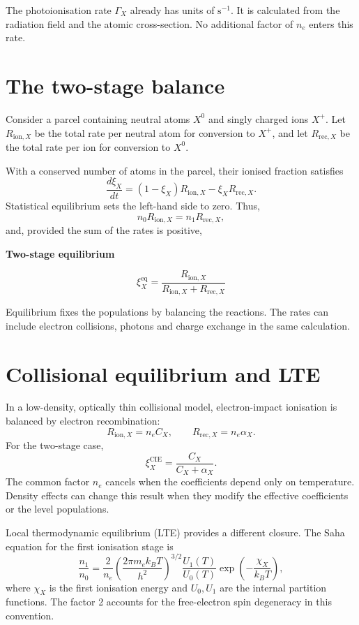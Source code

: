 \documentclass[a4paper,10pt,twoside,openany]{book}
\numberwithin{equation}{chapter}
\newcommand{\formula}[2][]{%
  \begin{tcolorbox}[enhanced,breakable,
    colback=LightOrange,colframe=Cap2Orange,arc=6pt,boxrule=1.2pt]
    \if\relax\detokenize{#1}\relax\else
      {\small\bfseries\color{Cap2Orange}#1}\par\smallskip
    \fi
    \begin{equation*}#2\end{equation*}
  \end{tcolorbox}}
\begin{document}
The photoionisation rate $\Gamma_X$ already has units of
$\mathrm{s^{-1}}$. It is calculated from the radiation field and
the atomic cross-section. No additional factor of $n_e$ enters this
rate.

\section{The two-stage balance}
Consider a parcel containing neutral atoms $X^0$ and singly charged
ions $X^+$. Let $R_{\mathrm{ion},X}$ be the total rate per neutral
atom for conversion to $X^+$, and let $R_{\mathrm{rec},X}$ be the
total rate per ion for conversion to $X^0$.

With a conserved number of atoms in the parcel, their ionised
fraction satisfies
\begin{equation}
  \frac{d\xi_X}{dt}
  =(1-\xi_X)R_{\mathrm{ion},X}
  -\xi_X R_{\mathrm{rec},X}.
  \label{eq:two_stage_time}
\end{equation}
Statistical equilibrium sets the left-hand side to zero. Thus,
\begin{equation}
  n_0R_{\mathrm{ion},X}=n_1R_{\mathrm{rec},X},
\end{equation}
and, provided the sum of the rates is positive,
\formula[Two-stage equilibrium]{
  \xi_X^{\mathrm{eq}}
  =\frac{R_{\mathrm{ion},X}}
  {R_{\mathrm{ion},X}+R_{\mathrm{rec},X}}}

Equilibrium fixes the populations by balancing the reactions.
The rates can include electron collisions, photons and charge
exchange in the same calculation.

\section{Collisional equilibrium and LTE}
In a low-density, optically thin collisional model, electron-impact
ionisation is balanced by electron recombination:
\begin{equation}
  R_{\mathrm{ion},X}=n_eC_X,\qquad
  R_{\mathrm{rec},X}=n_e\alpha_X.
\end{equation}
For the two-stage case,
\begin{equation}
  \xi_X^{\mathrm{CIE}}=\frac{C_X}{C_X+\alpha_X}.
\end{equation}
The common factor $n_e$ cancels when the coefficients depend only
on temperature. Density effects can change this result when they
modify the effective coefficients or the level populations.

Local thermodynamic equilibrium (LTE) provides a different closure.
The Saha equation for the first ionisation stage is
\begin{equation}
  \frac{n_1}{n_0}
  =\frac{2}{n_e}
   \left(\frac{2\pi m_ek_BT}{h^2}\right)^{3/2}
   \frac{U_1(T)}{U_0(T)}
   \exp\left(-\frac{\chi_X}{k_BT}\right),
  \label{eq:saha}
\end{equation}
where $\chi_X$ is the first ionisation energy and $U_0,U_1$ are
the internal partition functions. The factor 2 accounts for the
free-electron spin degeneracy in this convention.
\end{document}
